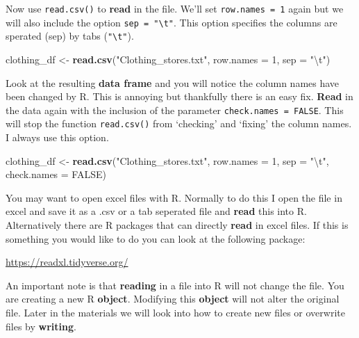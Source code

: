 \documentclass[]{book}
\newenvironment{Shaded}{\begin{snugshade}}{\end{snugshade}}
\newcommand{\KeywordTok}[1]{\textcolor[rgb]{0.13,0.29,0.53}{\textbf{#1}}}
\newcommand{\DataTypeTok}[1]{\textcolor[rgb]{0.13,0.29,0.53}{#1}}
\newcommand{\DecValTok}[1]{\textcolor[rgb]{0.00,0.00,0.81}{#1}}
\newcommand{\CharTok}[1]{\textcolor[rgb]{0.31,0.60,0.02}{#1}}
\newcommand{\StringTok}[1]{\textcolor[rgb]{0.31,0.60,0.02}{#1}}
\newcommand{\OtherTok}[1]{\textcolor[rgb]{0.56,0.35,0.01}{#1}}
\newcommand{\NormalTok}[1]{#1}
\begin{document}
Now use \texttt{read.csv()} to \textbf{read} in the file. We'll set
\texttt{row.names\ =\ 1} again but we will also include the option
\texttt{sep\ =\ "\textbackslash{}t"}. This option specifies the columns
are sperated (sep) by tabs (\texttt{"\textbackslash{}t"}).

\begin{Shaded}
\begin{Highlighting}[]
\NormalTok{clothing_df <-}\StringTok{ }\KeywordTok{read.csv}\NormalTok{(}\StringTok{"Clothing_stores.txt"}\NormalTok{, }\DataTypeTok{row.names =} \DecValTok{1}\NormalTok{, }\DataTypeTok{sep =} \StringTok{"}\CharTok{\textbackslash{}t}\StringTok{"}\NormalTok{)}
\end{Highlighting}
\end{Shaded}

Look at the resulting \textbf{data frame} and you will notice the column
names have been changed by R. This is annoying but thankfully there is
an easy fix. \textbf{Read} in the data again with the inclusion of the
parameter \texttt{check.names\ =\ FALSE}. This will stop the function
\texttt{read.csv()} from `checking' and `fixing' the column names. I
always use this option.

\begin{Shaded}
\begin{Highlighting}[]
\NormalTok{clothing_df <-}\StringTok{ }\KeywordTok{read.csv}\NormalTok{(}\StringTok{"Clothing_stores.txt"}\NormalTok{, }\DataTypeTok{row.names =} \DecValTok{1}\NormalTok{, }
                        \DataTypeTok{sep =} \StringTok{"}\CharTok{\textbackslash{}t}\StringTok{"}\NormalTok{, }\DataTypeTok{check.names =} \OtherTok{FALSE}\NormalTok{)}
\end{Highlighting}
\end{Shaded}

You may want to open excel files with R. Normally to do this I open the
file in excel and save it as a .csv or a tab seperated file and
\textbf{read} this into R. Alternatively there are R packages that can
directly \textbf{read} in excel files. If this is something you would
like to do you can look at the following package:

\url{https://readxl.tidyverse.org/}

An important note is that \textbf{reading} in a file into R will not
change the file. You are creating a new R \textbf{object}. Modifying
this \textbf{object} will not alter the original file. Later in the
materials we will look into how to create new files or overwrite files
by \textbf{writing}.
\end{document}
